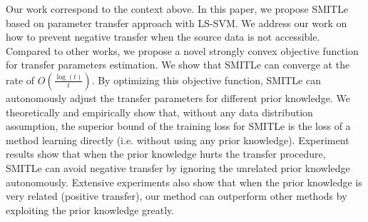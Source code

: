 Our work correspond to the context above. In this paper, we propose SMITLe based on parameter transfer approach with LS-SVM. We address our work on how to prevent negative transfer when the source data is not accessible. Compared to other works, we propose a novel strongly convex objective function for transfer parameters estimation. We show that SMITLe can converge at the rate of $O(\frac{\log(t)}{t})$. 
By optimizing this objective function, SMITLe can autonomously adjust the transfer parameters for different prior knowledge. We theoretically and empirically show that, without any data distribution assumption, the superior bound of the training loss for SMITLe is the loss of a method learning directly (i.e. without using any prior knowledge). Experiment results show that when the prior knowledge hurts the transfer procedure, SMITLe can avoid negative transfer by ignoring the unrelated prior knowledge autonomously. Extensive experiments also show that when the prior knowledge is very related (positive transfer), our method can outperform other methods by exploiting the prior knowledge greatly.
